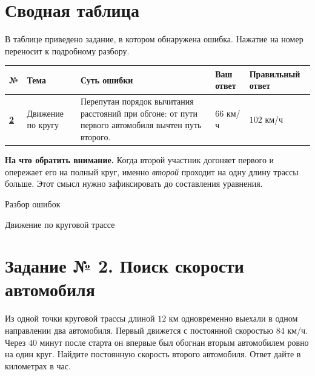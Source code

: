 \documentclass[a4paper,12pt]{article}
\newcommand{\subtopic}[1]{\par\medskip\noindent{\bfseries\color{darkaccent}#1}\par\vspace{-2pt}}
\begin{document}
\section*{Сводная таблица}
\smallskip
В таблице приведено задание, в котором обнаружена ошибка. Нажатие на номер переносит к подробному разбору.\par
\vspace{6mm}
\begingroup
\renewcommand{\arraystretch}{1.45}
\small
\begin{tabularx}{\linewidth}{@{}>{\centering\arraybackslash}p{13mm} >{\raggedright\arraybackslash}p{28mm} >{\raggedright\arraybackslash}X >{\centering\arraybackslash}p{22mm} >{\centering\arraybackslash}p{26mm}@{}}
\toprule
\textbf{№} & \textbf{Тема} & \textbf{Суть ошибки} & \textbf{Ваш ответ} & \textbf{Правильный ответ}\\
\midrule
\hyperref[task:2]{\textbf{2}} & Движение по кругу & Перепутан порядок вычитания расстояний при обгоне: от пути первого автомобиля вычтен путь второго. & $66$ км/ч & $102$ км/ч\\
\bottomrule
\end{tabularx}\par
\endgroup
\vspace{9mm}
\textcolor{darkaccent}{\textbf{На что обратить внимание.}}
Когда второй участник догоняет первого и опережает его на полный круг, именно \emph{второй} проходит на одну длину трассы больше. Этот смысл нужно зафиксировать до составления уравнения.
\clearpage
\thispagestyle{plain}
\vspace*{0.37\textheight}
\begin{center}
{\LARGE\color{darkaccent} Разбор ошибок}\par
\vspace{5mm}
{\normalsize\color{textgray} Движение по круговой трассе}
\end{center}
\clearpage
{}\label{task:2}
\section*{Задание № 2. Поиск скорости автомобиля}
\subtopic{Текст задания}
Из одной точки круговой трассы длиной $12$ км одновременно выехали в одном направлении два автомобиля. Первый движется с постоянной скоростью $84$ км/ч. Через $40$ минут после старта он впервые был обогнан вторым автомобилем ровно на один круг. Найдите постоянную скорость второго автомобиля. Ответ дайте в километрах в час.
\end{document}
